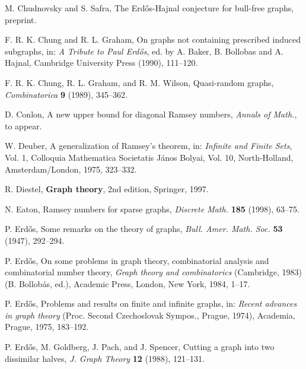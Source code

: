 \documentclass[11pt]{article}
\begin{document}
\begin{thebibliography}{}
M. Chudnovsky and S. Safra, The Erd\H{o}s-Hajnal conjecture for
bull-free graphs, preprint.

F. R. K. Chung and R. L. Graham, On graphs not containing prescribed
induced subgraphs, in: {\it A Tribute to Paul Erd\H{o}s}, ed. by A.
Baker, B. Bollobas and A. Hajnal, Cambridge University Press (1990),
111--120.

F. R. K. Chung, R. L. Graham, and R. M. Wilson, Quasi-random graphs,
{\it Combinatorica} {\bf 9} (1989), 345--362.


D. Conlon, A new upper bound for diagonal Ramsey numbers, {\em Annals of
Math.}, to appear.


W. Deuber, A generalization of Ramsey's theorem, in: {\it Infinite
and Finite Sets}, Vol. 1, Colloquia Mathematica Societatis J\'anos
Bolyai, Vol. 10, North-Holland, Amsterdam/London, 1975, 323--332.

R. Diestel, {\bf Graph theory}, 2nd edition, Springer, 1997.

N. Eaton, Ramsey numbers for sparse graphs, {\it Discrete Math.}
{\bf 185} (1998), 63--75.


P. Erd\H{o}s, Some remarks on the theory of graphs, {\it Bull. Amer. Math. Soc.} {\bf 53} (1947), 292--294.

P. Erd\H{o}s, On some problems in graph theory, combinatorial
analysis and combinatorial number theory, {\it Graph theory and
combinatorics} (Cambridge, 1983) (B. Bollob\'as, ed.), Academic
Press, London, New York, 1984, 1--17.

P. Erd\H{o}s,  Problems and results on finite and infinite graphs,
in: {\em Recent advances in graph theory }(Proc. Second Czechoslovak
Sympos., Prague, 1974), Academia, Prague, 1975, 183--192.


P. Erd\H{o}s, M. Goldberg, J. Pach, and J. Spencer, Cutting a graph
into two dissimilar halves, {\it J. Graph Theory} {\bf 12} (1988),
121--131.


\end{thebibliography}
\end{document}
